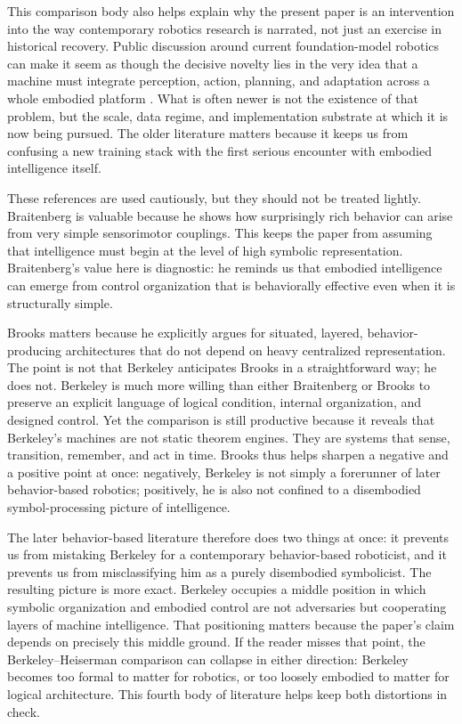 \documentclass[11pt]{article}
\begin{document}
This comparison body also helps explain why the present paper is an intervention into the way contemporary robotics research is narrated, not just an exercise in historical recovery. Public discussion around current foundation-model robotics can make it seem as though the decisive novelty lies in the very idea that a machine must integrate perception, action, planning, and adaptation across a whole embodied platform \citep{googledeepmind2025geminirobotics,googledeepmind2026geminier}. What is often newer is not the existence of that problem, but the scale, data regime, and implementation substrate at which it is now being pursued. The older literature matters because it keeps us from confusing a new training stack with the first serious encounter with embodied intelligence itself.

These references are used cautiously, but they should not be treated lightly. Braitenberg is valuable because he shows how surprisingly rich behavior can arise from very simple sensorimotor couplings. This keeps the paper from assuming that intelligence must begin at the level of high symbolic representation. Braitenberg's value here is diagnostic: he reminds us that embodied intelligence can emerge from control organization that is behaviorally effective even when it is structurally simple.

Brooks matters because he explicitly argues for situated, layered, behavior-producing architectures that do not depend on heavy centralized representation. The point is not that Berkeley anticipates Brooks in a straightforward way; he does not. Berkeley is much more willing than either Braitenberg or Brooks to preserve an explicit language of logical condition, internal organization, and designed control. Yet the comparison is still productive because it reveals that Berkeley's machines are not static theorem engines. They are systems that sense, transition, remember, and act in time. Brooks thus helps sharpen a negative and a positive point at once: negatively, Berkeley is not simply a forerunner of later behavior-based robotics; positively, he is also not confined to a disembodied symbol-processing picture of intelligence.

The later behavior-based literature therefore does two things at once: it prevents us from mistaking Berkeley for a contemporary behavior-based roboticist, and it prevents us from misclassifying him as a purely disembodied symbolicist. The resulting picture is more exact. Berkeley occupies a middle position in which symbolic organization and embodied control are not adversaries but cooperating layers of machine intelligence. That positioning matters because the paper's claim depends on precisely this middle ground. If the reader misses that point, the Berkeley--Heiserman comparison can collapse in either direction: Berkeley becomes too formal to matter for robotics, or too loosely embodied to matter for logical architecture. This fourth body of literature helps keep both distortions in check.
\end{document}
